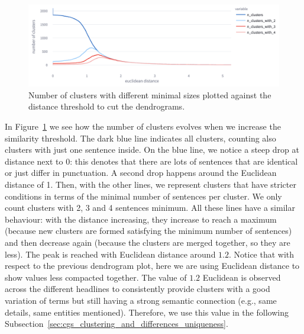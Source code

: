 \begin{figure}[!htbp]
    \centering
    \includegraphics[width=\linewidth]{figures/clusters_count_by_threshold_bigger_2.png}
    \caption{
    Number of clusters with different minimal sizes plotted against the distance threshold to cut the dendrograms.
    }
    \label{fig:clusers_count_by_threshold}
\end{figure}
In Figure~\ref{fig:clusers_count_by_threshold} we see how the number of clusters evolves when we increase the similarity threshold. 
The dark blue line indicates all clusters, counting also clusters with just one sentence inside.
On the blue line, we notice a steep drop at distance next to $0$: this denotes that there are lots of sentences that are identical or just differ in punctuation.
A second drop happens around the Euclidean distance of 1.
Then, with the other lines, we represent clusters that have stricter conditions in terms of the minimal number of sentences per cluster. We only count clusters with 2, 3 and 4 sentences minimum.
All these lines have a similar behaviour: with the distance increasing, they increase to reach a maximum (because new clusters are formed satisfying the minimum number of sentences) and then decrease again (because the clusters are merged together, so they are less). 
The peak is reached with Euclidean distance around $1.2$.
Notice that with respect to the previous dendrogram plot, here we are using Euclidean distance to show values less compacted together.
The value of $1.2$ Euclidean is observed across the different headlines to consistently provide clusters with a good variation of terms but still having a strong semantic connection (e.g., same details, same entities mentioned).
Therefore, we use this value in the following Subsection~\ref{sec:cgs_clustering_and_differences_uniqueness}.

